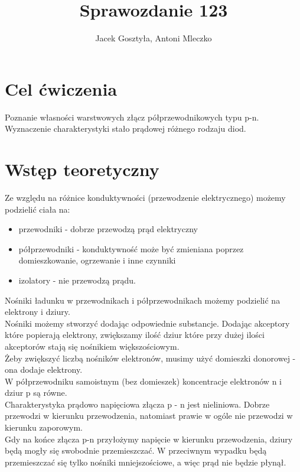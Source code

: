\documentclass[11pt]{article}
\begin{document}
\title{Sprawozdanie 123}
\author{Jacek Gosztyła, Antoni Mleczko}
\maketitle
\section{Cel ćwiczenia} 
Poznanie własności warstwowych złącz półprzewodnikowych typu p-n. Wyznaczenie charakterystyki stało prądowej różnego rodzaju diod. 
\section{Wstęp teoretyczny}
Ze względu na różnice konduktywności (przewodzenie elektrycznego) możemy podzielić ciała na: 
\begin{itemize}
\item przewodniki - dobrze przewodzą prąd elektryczny
\item półprzewodniki - konduktywność może być zmieniana poprzez domieszkowanie, ogrzewanie i inne czynniki
\item izolatory - nie przewodzą prądu. 
\end{itemize}

Nośniki ładunku w przewodnikach i półprzewodnikach możemy podzielić na elektrony i dziury. \\
Nośniki możemy stworzyć dodając odpowiednie substancje. Dodając akceptory które popierają elektrony, zwiększamy ilość dziur które przy dużej ilości akceptorów stają się nośnikiem większościowym. \\
Żeby zwiększyć liczbą nośników elektronów, musimy użyć  domieszki donorowej - ona dodaje elektrony. \\
W półprzewodniku samoistnym (bez domieszek) koncentracje elektronów n i dziur p są równe. \\
Charakterystyka prądowo napięciowa złącza p - n jest nieliniowa. Dobrze przewodzi w kierunku przewodzenia, natomiast prawie w ogóle nie przewodzi w  kierunku zaporowym.  \\ 
Gdy na końce złącza p-n przyłożymy napięcie w kierunku przewodzenia, dziury będą mogły się swobodnie przemieszczać. W przeciwnym wypadku będą przemieszczać się tylko nośniki mniejszościowe, a więc prąd nie będzie płynął. 


\end{document}
